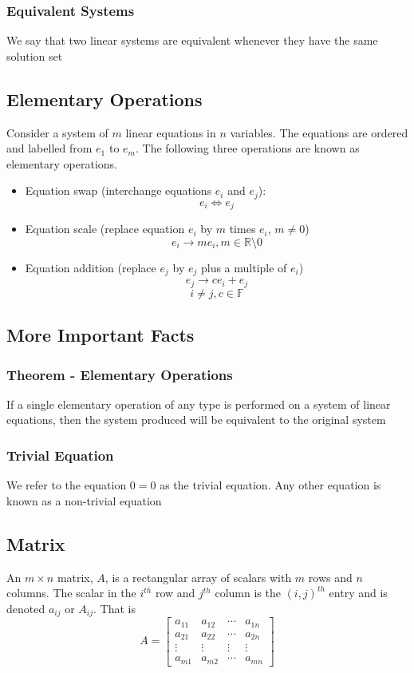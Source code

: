 \documentclass[12pt, letterpaper]{article}
\begin{document}
\subsubsection{Equivalent Systems}
We say that two linear systems are equivalent whenever they have the same solution set
\subsection{Elementary Operations}
Consider a system of $m$ linear equations in $n$ variables. The equations are ordered and labelled from $e_1$ to $e_m$. The following 
three operations are known as elementary operations.
\begin{itemize}
    \item Equation swap (interchange equations $e_i$ and $e_j$): \[e_i \iff e_j\]
    \item Equation scale (replace equation $e_i$ by $m$ times $e_i$, $m\neq 0$) \[e_i \rightarrow me_i, m\in\mathbb{R}\setminus{0}\]
    \item Equation addition (replace $e_j$ by $e_j$ plus a multiple of $e_i$) \[e_j \rightarrow ce_i+e_j\]\[i\neq j, c\in\mathbb{F}\]
\end{itemize}
\subsection{More Important Facts}
\subsubsection{Theorem - Elementary Operations}
If a single elementary operation of any type is performed on a system of linear equations, then the system produced will be equivalent to the original system 
\subsubsection{Trivial Equation}
We refer to the equation $0=0$ as the trivial equation. Any other equation is known as a non-trivial equation
\subsection{Matrix}
An $m\times n$ matrix, $A$, is a rectangular array of scalars with $m$ rows and $n$ columns. The scalar in the $i^{th}$ row and $j^{th}$ 
column is the $(i, j)^{th}$ entry and is denoted $a_{ij}$ or $A_{ij}$. That is 
\[A=\begin{bmatrix}
    a_{11} & a_{12} & \cdots & a_{1n} \\
    a_{21} & a_{22} & \cdots & a_{2n} \\
    \vdots & \vdots & \vdots & \vdots \\
    a_{m1} & a_{m2} & \cdots & a_{mn}
\end{bmatrix}\]
\end{document}
